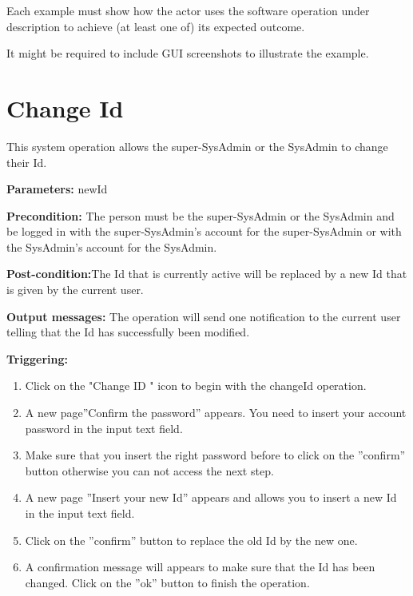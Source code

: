 Each example must show how the actor uses the software operation under
description to achieve (at least one of) its expected outcome.

It might be required to include GUI screenshots to illustrate the example.




\section{Change Id}
\label{operation:changeId}
This system operation allows the super-SysAdmin or the SysAdmin to change
their Id.

\begin{description}

\item \textbf{Parameters:} newId
\item \textbf{Precondition:} The person must be the super-SysAdmin or the
SysAdmin and be logged in with the super-SysAdmin's account for the
super-SysAdmin or with the SysAdmin's account for the SysAdmin.
\item \textbf{Post-condition:}The Id that is currently active will be
replaced by a new Id that is given by the current user.
\item \textbf{Output messages:} The operation will send one notification to the
current user telling that the Id  has successfully been modified.


\item \textbf{Triggering:}
\begin{enumerate}
\item Click on the "Change ID " icon to begin with the changeId operation. 
\item A new page''Confirm the password'' appears. You need to insert your
account password in the input text field. 
\item Make sure that you insert the right password before to click on the
''confirm'' button otherwise you can not access the next step.
\item A new page ''Insert your new Id'' appears and allows you to
insert a new Id in the input text field.
\item Click on the ''confirm'' button to replace the old Id by the new one.
\item A confirmation message will appears to make sure that the Id
has been changed. Click on the ''ok'' button to finish the operation.
\end{enumerate}

 
\end{description}

